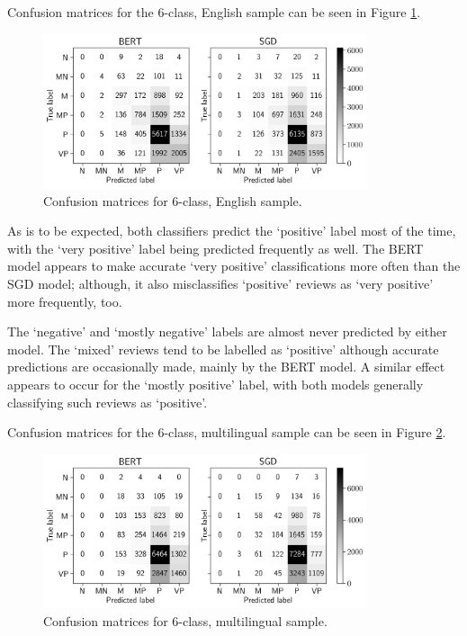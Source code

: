 Confusion matrices for the 6-class, English sample can be seen in Figure \ref{fig:Res_PU_CM_E6}.

\begin{figure}[ht]
    \centering
    \includegraphics[width=0.85\textwidth]{figures/06_results/02_pu/01_cm/eng_6.png}
    \caption{Confusion matrices for 6-class, English sample.}
    \label{fig:Res_PU_CM_E6}
\end{figure}

As is to be expected, both classifiers predict the `positive' label most of the time, with the `very positive' label being predicted frequently as well. The BERT model appears to make accurate `very positive' classifications more often than the SGD model; although, it also misclassifies `positive' reviews as `very positive' more frequently, too.

The `negative' and `mostly negative' labels are almost never predicted by either model. The `mixed' reviews tend to be labelled as `positive' although accurate predictions are occasionally made, mainly by the BERT model. A similar effect appears to occur for the `mostly positive' label, with both models generally classifying such reviews as `positive'.

Confusion matrices for the 6-class, multilingual sample can be seen in Figure \ref{fig:Res_PU_CM_M6}.

\begin{figure}[ht]
    \centering
    \includegraphics[width=0.85\textwidth]{figures/06_results/02_pu/01_cm/any_6.png}
    \caption{Confusion matrices for 6-class, multilingual sample.}
    \label{fig:Res_PU_CM_M6}
\end{figure}

